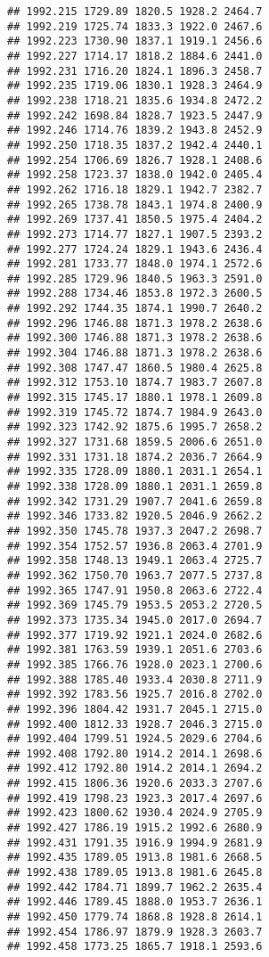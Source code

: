 \documentclass[
]{article}
\begin{document}
\begin{verbatim}
## 1992.215 1729.89 1820.5 1928.2 2464.7
## 1992.219 1725.74 1833.3 1922.0 2467.6
## 1992.223 1730.90 1837.1 1919.1 2456.6
## 1992.227 1714.17 1818.2 1884.6 2441.0
## 1992.231 1716.20 1824.1 1896.3 2458.7
## 1992.235 1719.06 1830.1 1928.3 2464.9
## 1992.238 1718.21 1835.6 1934.8 2472.2
## 1992.242 1698.84 1828.7 1923.5 2447.9
## 1992.246 1714.76 1839.2 1943.8 2452.9
## 1992.250 1718.35 1837.2 1942.4 2440.1
## 1992.254 1706.69 1826.7 1928.1 2408.6
## 1992.258 1723.37 1838.0 1942.0 2405.4
## 1992.262 1716.18 1829.1 1942.7 2382.7
## 1992.265 1738.78 1843.1 1974.8 2400.9
## 1992.269 1737.41 1850.5 1975.4 2404.2
## 1992.273 1714.77 1827.1 1907.5 2393.2
## 1992.277 1724.24 1829.1 1943.6 2436.4
## 1992.281 1733.77 1848.0 1974.1 2572.6
## 1992.285 1729.96 1840.5 1963.3 2591.0
## 1992.288 1734.46 1853.8 1972.3 2600.5
## 1992.292 1744.35 1874.1 1990.7 2640.2
## 1992.296 1746.88 1871.3 1978.2 2638.6
## 1992.300 1746.88 1871.3 1978.2 2638.6
## 1992.304 1746.88 1871.3 1978.2 2638.6
## 1992.308 1747.47 1860.5 1980.4 2625.8
## 1992.312 1753.10 1874.7 1983.7 2607.8
## 1992.315 1745.17 1880.1 1978.1 2609.8
## 1992.319 1745.72 1874.7 1984.9 2643.0
## 1992.323 1742.92 1875.6 1995.7 2658.2
## 1992.327 1731.68 1859.5 2006.6 2651.0
## 1992.331 1731.18 1874.2 2036.7 2664.9
## 1992.335 1728.09 1880.1 2031.1 2654.1
## 1992.338 1728.09 1880.1 2031.1 2659.8
## 1992.342 1731.29 1907.7 2041.6 2659.8
## 1992.346 1733.82 1920.5 2046.9 2662.2
## 1992.350 1745.78 1937.3 2047.2 2698.7
## 1992.354 1752.57 1936.8 2063.4 2701.9
## 1992.358 1748.13 1949.1 2063.4 2725.7
## 1992.362 1750.70 1963.7 2077.5 2737.8
## 1992.365 1747.91 1950.8 2063.6 2722.4
## 1992.369 1745.79 1953.5 2053.2 2720.5
## 1992.373 1735.34 1945.0 2017.0 2694.7
## 1992.377 1719.92 1921.1 2024.0 2682.6
## 1992.381 1763.59 1939.1 2051.6 2703.6
## 1992.385 1766.76 1928.0 2023.1 2700.6
## 1992.388 1785.40 1933.4 2030.8 2711.9
## 1992.392 1783.56 1925.7 2016.8 2702.0
## 1992.396 1804.42 1931.7 2045.1 2715.0
## 1992.400 1812.33 1928.7 2046.3 2715.0
## 1992.404 1799.51 1924.5 2029.6 2704.6
## 1992.408 1792.80 1914.2 2014.1 2698.6
## 1992.412 1792.80 1914.2 2014.1 2694.2
## 1992.415 1806.36 1920.6 2033.3 2707.6
## 1992.419 1798.23 1923.3 2017.4 2697.6
## 1992.423 1800.62 1930.4 2024.9 2705.9
## 1992.427 1786.19 1915.2 1992.6 2680.9
## 1992.431 1791.35 1916.9 1994.9 2681.9
## 1992.435 1789.05 1913.8 1981.6 2668.5
## 1992.438 1789.05 1913.8 1981.6 2645.8
## 1992.442 1784.71 1899.7 1962.2 2635.4
## 1992.446 1789.45 1888.0 1953.7 2636.1
## 1992.450 1779.74 1868.8 1928.8 2614.1
## 1992.454 1786.97 1879.9 1928.3 2603.7
## 1992.458 1773.25 1865.7 1918.1 2593.6

\end{verbatim}
\end{document}
